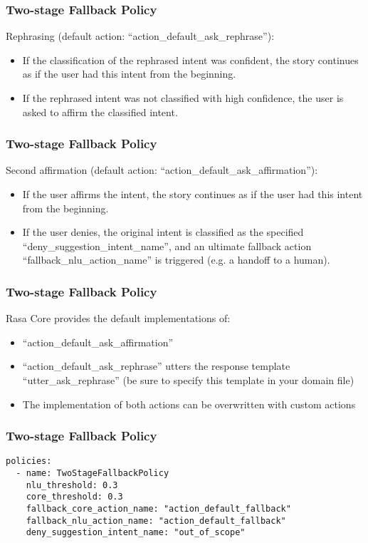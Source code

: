  \begin{frame}[fragile]\frametitle{Two-stage Fallback Policy}
 Rephrasing (default action: ``action\_default\_ask\_rephrase''):
\begin{itemize}
\item If the classification of the rephrased intent was confident, the story continues as if the user had this intent from the beginning.
\item If the rephrased intent was not classified with high confidence, the user is asked to affirm the classified intent.
\end{itemize}
\end{frame}

 \begin{frame}[fragile]\frametitle{Two-stage Fallback Policy}
 Second affirmation (default action: ``action\_default\_ask\_affirmation''):
\begin{itemize}
\item If the user affirms the intent, the story continues as if the user had this intent from the beginning.
\item If the user denies, the original intent is classified as the specified ``deny\_suggestion\_intent\_name'', and an ultimate fallback action ``fallback\_nlu\_action\_name'' is triggered (e.g. a handoff to a human).
\end{itemize}
\end{frame}

 \begin{frame}[fragile]\frametitle{Two-stage Fallback Policy}
Rasa Core provides the default implementations of:
\begin{itemize}
\item ``action\_default\_ask\_affirmation''
\item ``action\_default\_ask\_rephrase'' utters the response template ``utter\_ask\_rephrase'' (be sure to specify this template in your domain file)
\item The implementation of both actions can be overwritten with custom actions
\end{itemize}
\end{frame}

 \begin{frame}[fragile]\frametitle{Two-stage Fallback Policy}
\begin{lstlisting}
policies:
  - name: TwoStageFallbackPolicy
    nlu_threshold: 0.3
    core_threshold: 0.3
    fallback_core_action_name: "action_default_fallback"
    fallback_nlu_action_name: "action_default_fallback"
    deny_suggestion_intent_name: "out_of_scope"
\end{lstlisting}

\end{frame}